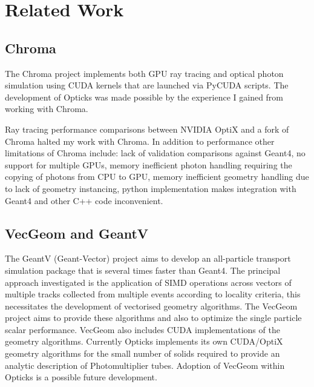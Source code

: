 \documentclass[a4paper]{jpconf}
\begin{document}
\section{Related Work}

\subsection{Chroma}

The Chroma project\cite{chromaURL}\cite{chromaB}  
implements both GPU ray tracing and optical photon simulation using CUDA kernels
that are launched via PyCUDA scripts. 
The development of Opticks was made possible by  
the experience I gained from working with Chroma.

Ray tracing performance comparisons between NVIDIA OptiX and a 
fork of Chroma\cite{chromaFork} halted my work with Chroma.
In addition to performance other limitations of Chroma include:
lack of validation comparisons against Geant4, no support for multiple GPUs, 
memory inefficient photon handling requiring the copying of photons from CPU to GPU,
memory inefficient geometry handling due to lack of geometry instancing, python 
implementation makes integration with Geant4 and other C++ code inconvenient. 

\subsection{VecGeom and GeantV}


The GeantV\cite{GeantV} (Geant-Vector) project aims 
to develop an all-particle transport simulation package that is 
several times faster than Geant4. The principal approach investigated 
is the application of SIMD operations across vectors of multiple tracks 
collected from multiple events according to locality criteria, this necessitates 
the development of vectorised geometry algorithms.  
The VecGeom\cite{VecGeom} project aims to provide these algorithms and also 
to optimize the single particle scalar performance.
VecGeom also includes CUDA implementations of the geometry algorithms.
%
Currently Opticks implements its own CUDA/OptiX geometry algorithms
for the small number of solids required to provide an analytic description 
of Photomultiplier tubes. 
Adoption of VecGeom within Opticks is a possible future development.
\end{document}
